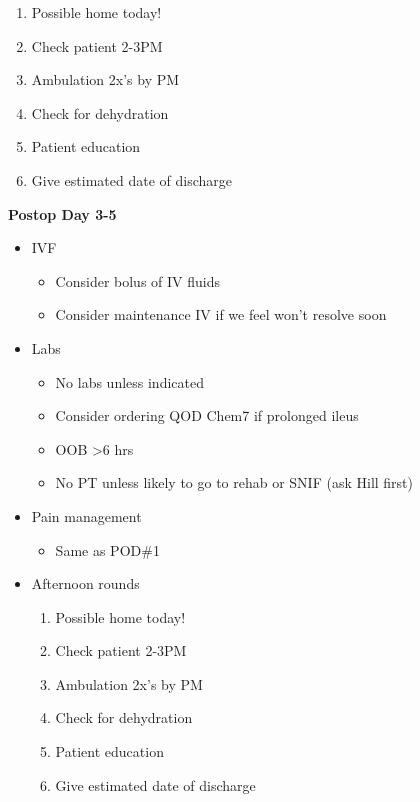 \documentclass[
  letterpaper,
]{scrbook}
\providecommand{\tightlist}{%
  \setlength{\itemsep}{0pt}\setlength{\parskip}{0pt}}
\begin{document}
\begin{enumerate}
\def\labelenumi{\arabic{enumi})}
\tightlist
\item
  Possible home today!
\item
  Check patient 2-3PM
\item
  Ambulation 2x's by PM
\item
  Check for dehydration
\item
  Patient education
\item
  Give estimated date of discharge
\end{enumerate}

\textbf{Postop Day 3-5}

\begin{itemize}
\item
  IVF

  \begin{itemize}
  \tightlist
  \item
    Consider bolus of IV fluids
  \item
    Consider maintenance IV if we feel won't resolve soon
  \end{itemize}
\item
  Labs

  \begin{itemize}
  \tightlist
  \item
    No labs unless indicated
  \item
    Consider ordering QOD Chem7 if prolonged ileus
  \item
    OOB \textgreater6 hrs
  \item
    No PT unless likely to go to rehab or SNIF (ask Hill first)
  \end{itemize}
\item
  Pain management

  \begin{itemize}
  \tightlist
  \item
    Same as POD\#1
  \end{itemize}
\item
  Afternoon rounds

  \begin{enumerate}
  \def\labelenumi{\arabic{enumi})}
  \tightlist
  \item
    Possible home today!
  \item
    Check patient 2-3PM
  \item
    Ambulation 2x's by PM
  \item
    Check for dehydration
  \item
    Patient education
  \item
    Give estimated date of discharge
  \end{enumerate}
\end{itemize}
\end{document}
